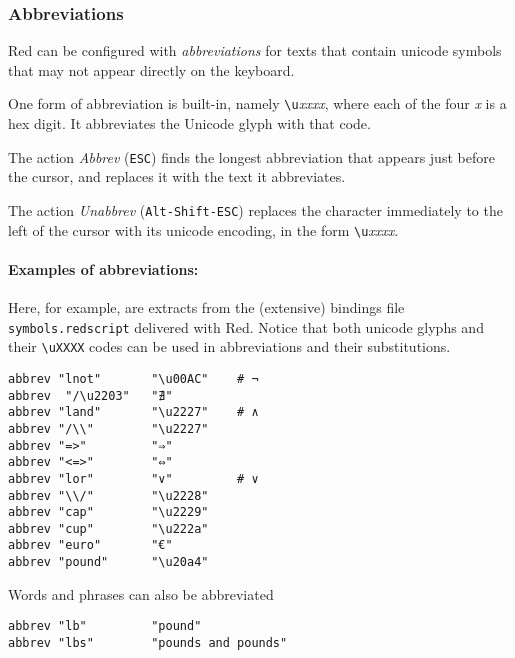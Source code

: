 \documentclass[12pt,a4paper]{article}
\begin{document}
\hypertarget{abbreviations}{%
\subsubsection{Abbreviations}\label{abbreviations}}

Red can be configured with \emph{abbreviations} for texts that contain
unicode symbols that may not appear directly on the keyboard.

One form of abbreviation is built-in, namely
\texttt{\textbackslash{}u}\emph{xxxx}, where each of the four \emph{x}
is a hex digit. It abbreviates the Unicode glyph with that code.

The action \emph{Abbrev} (\texttt{ESC}) finds the longest abbreviation
that appears just before the cursor, and replaces it with the text it
abbreviates.

The action \emph{Unabbrev} (\texttt{Alt-Shift-ESC}) replaces the
character immediately to the left of the cursor with its unicode
encoding, in the form \texttt{\textbackslash{}u}\emph{xxxx}.

\hypertarget{examples-of-abbreviations}{%
\paragraph{Examples of abbreviations:}\label{examples-of-abbreviations}}

Here, for example, are extracts from the (extensive) bindings file
\texttt{symbols.redscript} delivered with Red. Notice that both unicode
glyphs and their
\texttt{\textbackslash{}u\textasciigrave{}\textasciigrave{}XXXX} codes
can be used in abbreviations and their substitutions.

\begin{verbatim}
abbrev "lnot"       "\u00AC"    # ¬
abbrev  "/\u2203"   "∄"
abbrev "land"       "\u2227"    # ∧
abbrev "/\\"        "\u2227" 
abbrev "=>"         "⇒" 
abbrev "<=>"        "⇔" 
abbrev "lor"        "∨"         # ∨
abbrev "\\/"        "\u2228"
abbrev "cap"        "\u2229" 
abbrev "cup"        "\u222a"  
abbrev "euro"       "€"  
abbrev "pound"      "\u20a4"
\end{verbatim}

Words and phrases can also be abbreviated

\begin{verbatim}
abbrev "lb"         "pound"
abbrev "lbs"        "pounds and pounds"
\end{verbatim}
\end{document}
